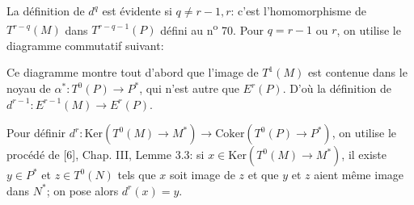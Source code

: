 La définition de $d^q$ est évidente si $q \neq r - 1, r$: c'est l'homomorphisme de $T^{r-q}(M)$ dans $T^{r-q-1}(P)$ défini au n\textsuperscript{o} 70. Pour $q = r - 1$ ou $r$, on utilise le diagramme commutatif suivant:

\begin{center}
\end{center}
Ce diagramme montre tout d'abord que l'image de $T^1(M)$ est contenue dans le noyau de $\alpha^*\colon T^0(P) \to P^*$, qui n'est autre que $E^r(P)$. D'où la définition de $d^{r-1}\colon E^{r-1}(M) \to E^r(P)$.

Pour définir $d^r\colon \mathrm{Ker}(T^0(M) \to M^*) \to \mathrm{Coker}(T^0(P) \to P^*)$, on utilise le procédé de [6], Chap. III, Lemme 3.3: si $x \in \mathrm{Ker}(T^0(M) \to M^*)$, il existe $y \in P^*$ et $z \in T^0(N)$ tels que $x$ soit image de $z$ et que $y$ et $z$ aient même image dans $N^*$; on pose alors $d^r(x) = y$.

